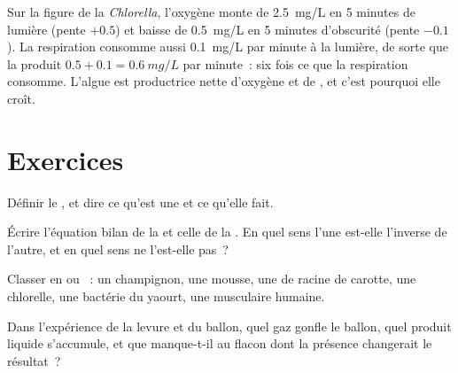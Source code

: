 \begin{example}\label{ex:g10:cell-metabolism:truerate}
Sur la figure de la \emph{Chlorella}, l'oxygène monte de
\qty{2.5}{mg/L} en 5 minutes de lumière (pente $+0.5$) et baisse de
\qty{0.5}{mg/L} en 5 minutes d'obscurité (pente $-0.1$). La
respiration consomme aussi \qty{0.1}{mg/L} par minute à la lumière, de
sorte que la  produit
$0.5 + 0.1 = \qty{0.6}{mg/L}$ par minute~: six fois ce que la
respiration consomme. L'algue est productrice nette d'oxygène et de
, et c'est pourquoi elle croît.
\end{example}

\section{Exercices}

\begin{exercise}[$\star$]\label{exo:g10:cell-metabolism:1}
Définir le , et dire ce qu'est une  et ce qu'elle fait.
\end{exercise}

\begin{exercise}[$\star$]\label{exo:g10:cell-metabolism:2}
Écrire l'équation bilan de la  et celle de la
. En quel sens l'une est-elle l'inverse de l'autre, et en
quel sens ne l'est-elle pas~?
\end{exercise}

\begin{exercise}[$\star$]\label{exo:g10:cell-metabolism:3}
Classer en  ou ~: un champignon, une mousse, une
 de racine de carotte, une chlorelle, une bactérie du yaourt,
une  musculaire humaine.
\end{exercise}

\begin{exercise}[$\star$]\label{exo:g10:cell-metabolism:4}
Dans l'expérience de la levure et du ballon, quel gaz gonfle le
ballon, quel produit liquide s'accumule, et que manque-t-il au flacon
dont la présence changerait le résultat~?
\end{exercise}


